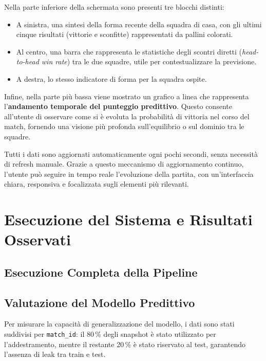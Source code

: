 \documentclass[a4paper,12pt]{report}
\begin{document}
Nella parte inferiore della schermata sono presenti tre blocchi distinti:
\begin{itemize}
  \item A sinistra, una sintesi della forma recente della squadra di casa, con gli ultimi cinque risultati (vittorie e sconfitte) rappresentati da pallini colorati.
  \item Al centro, una barra che rappresenta le statistiche degli scontri diretti (\textit{head-to-head win rate}) tra le due squadre, utile per contestualizzare la previsione.
  \item A destra, lo stesso indicatore di forma per la squadra ospite.
\end{itemize}

Infine, nella parte più bassa viene mostrato un grafico a linea che rappresenta l’\textbf{andamento temporale del punteggio predittivo}. Questo consente all’utente di osservare come si è evoluta la probabilità di vittoria nel corso del match, fornendo una visione più profonda sull’equilibrio o sul dominio tra le squadre.

Tutti i dati sono aggiornati automaticamente ogni pochi secondi, senza necessità di refresh manuale. Grazie a questo meccanismo di aggiornamento continuo, l’utente può seguire in tempo reale l’evoluzione della partita, con un’interfaccia chiara, responsiva e focalizzata sugli elementi più rilevanti.





\chapter{Esecuzione del Sistema e Risultati Osservati}

\section{Esecuzione Completa della Pipeline}

\section{Valutazione del Modello Predittivo}

Per misurare la capacità di generalizzazione del modello, i dati sono stati suddivisi per \texttt{match\_id}: il 80\,\% degli snapshot è stato utilizzato per l’addestramento, mentre il restante 20\,\% è stato riservato al test, garantendo l’assenza di leak tra train e test.
\end{document}
